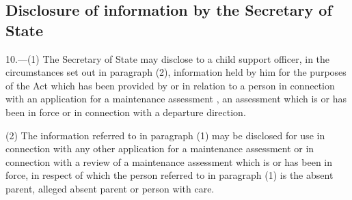 \documentclass[a4paper,12pt]{article}
\begin{document}

%

\subsection[10. Disclosure of information by the Secretary of State]{Disclosure of information by the Secretary of State}

10.—(1) The Secretary of State may disclose to a child support officer, in the circumstances set out in paragraph (2), information held by him for the purposes of the Act which has been provided by or in relation to a person in connection with an application for a maintenance assessment%
, an assessment which is or has been in force or in connection with a departure direction.  %

(2) The information referred to in paragraph (1) may be disclosed for use in connection with any other application for a maintenance assessment or in connection with a review of a maintenance assessment which is or has been in force, in respect of which the person referred to in paragraph (1) is the absent parent, alleged absent parent or person with care.

\end{document}
